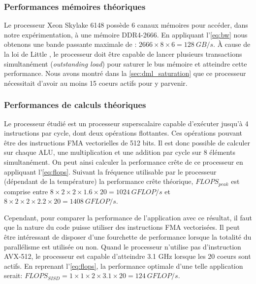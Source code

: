     
    

    \subsubsection{Performances mémoires théoriques}
        Le processeur Xeon Skylake 6148 possède 6 canaux mémoires pour accéder, dans notre expérimentation, à une mémoire DDR4-2666. En appliquant l'\autoref{eq:bw} nous obtenons une bande passante maximale de : $2666 \times 8 \times 6 = 128\ GB/s$. À cause de la loi de Little \cite{little2008little}, le processeur doit être capable de lancer plusieurs transactions simultanément (\textit{outstanding load}) pour saturer le bus mémoire et  atteindre cette performance. Nous avons montré dans la \autoref{sec:dml_saturation} que ce processeur nécessitait d'avoir au moins 15 coeurs actifs pour y parvenir.
        
    

    \subsubsection{Performances de calculs théoriques}
        Le processeur étudié est un processeur superscalaire capable d'exécuter jusqu'à 4 instructions par cycle, dont deux opérations flottantes. Ces opérations pouvant être des instructions \gls{FMA} vectorielles de 512 bits. Il est donc possible de calculer sur chaque ALU, une multiplication et une addition par cycle sur 8 éléments simultanément. On peut ainsi calculer la performance crête de ce processeur en appliquant l'\autoref{eq:flops}. Suivant la fréquence utilisable par le processeur (dépendant de la température) la performance crête théorique, $FLOPS_{peak}$ est comprise entre $8 \times 2 \times 2 \times 1.6 \times 20 = 1024\ GFLOP/s$ et  $8 \times 2 \times 2 \times 2.2 \times 20 = 1408\ GFLOP/s$. 
        
        Cependant, pour comparer la performance de l'application avec ce résultat, il faut que la nature du code puisse utiliser des instructions FMA vectorisées. Il peut être intéressant de disposer d'une fourchette de performance lorsque la totalité du parallélisme est utilisée ou non. Quand le processeur n'utilise pas d'instruction AVX-512, le processeur est capable d'atteindre 3.1 GHz lorsque les 20 coeurs sont actifs. En reprenant l'\autoref{eq:flops}, la performance optimale d'une telle application serait: $FLOPS_{SISD} = 1 \times 1 \times 2 \times 3.1 \times 20 = 124 \ GFLOP/s$.
    

